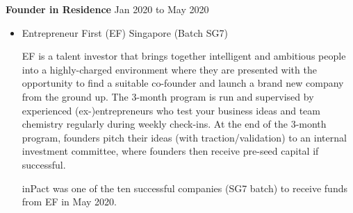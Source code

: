 \documentclass[10pt]{article}
\newenvironment{innerlist}[1][\enskip\textbullet]%
        {\begin{itemize}[#1,leftmargin=*,parsep=0pt,itemsep=0pt,topsep=0pt,partopsep=0pt]}
        {\end{itemize}}
\begin{document}
\textbf{Founder in Residence} \hfill {Jan 2020 to May 2020}
\begin{innerlist}

\item[] Entrepreneur First (EF) Singapore (Batch SG7)

        \vspace{0.1in}

        EF is a talent investor that brings together intelligent and ambitious
        people into a highly-charged environment where they are presented with
        the opportunity to find a suitable co-founder and launch a brand new
        company from the ground up. The 3-month program is run and supervised
        by experienced (ex-)entrepreneurs who test your business ideas and team
        chemistry regularly during weekly check-ins. At the end of the 3-month
        program, founders pitch their ideas (with traction/validation) to an
        internal investment committee, where founders then receive pre-seed
        capital if successful.

        \vspace{0.1in}

        inPact was one of the ten successful companies (SG7 batch) to
        receive funds from EF in May 2020.

\end{innerlist}
\vspace{0.1in}
\end{document}
